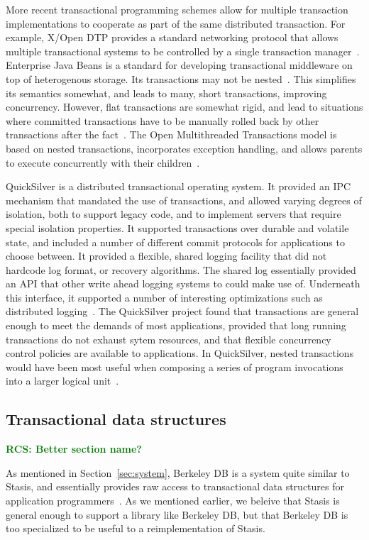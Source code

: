 \documentclass[letterpaper,twocolumn,10pt]{article}
\newcommand{\yad}{Stasis\xspace}
\newcommand{\rcs}[1]{\textcolor{green}{\bf RCS: #1}}
\begin{document}
More recent transactional programming schemes allow for multiple
transaction implementations to cooperate as part of the same
distributed transaction.  For example, X/Open DTP provides a standard
networking protocol that allows multiple transactional systems to be
controlled by a single transaction manager~\cite{something}.
Enterprise Java Beans is a standard for developing transactional
middleware on top of heterogenous storage.  Its
transactions may not be nested~\cite{something}.  This simplifies its
semantics somewhat, and leads to many, short transactions, 
improving concurrency.  However, flat transactions are somewhat rigid, and lead to
situations where committed transactions have to be manually rolled
back by other transactions after the fact~\cite{ejbCritique}.  The Open
Multithreaded Transactions model is based on nested transactions,
incorporates exception handling, and allows parents to execute
concurrently with their children~\cite{omtt}.

QuickSilver is a distributed transactional operating system.  It
provided an IPC mechanism that mandated the use of transactions, and
allowed varying degrees of isolation, both to support legacy code, and
to implement servers that require special isolation properties.  It
supported transactions over durable and volatile state, and included a
number of different commit protocols for applications to choose
between.  It provided a flexible, shared logging facility that did not
hardcode log format, or recovery algorithms.  The shared log
essentially provided an API that other write ahead logging systems to
could make use of.  Underneath this interface, it supported a number
of interesting optimizations such as distributed
logging~\cite{recoveryInQuickSilver}.  The QuickSilver project found
that transactions are general enough to meet the demands of most
applications, provided that long running transactions do not exhaust
sytem resources, and that flexible concurrency control policies are
available to applications.  In QuickSilver, nested transactions would
have been most useful when composing a series of program invocations
into a larger logical unit~\cite{experienceWithQuickSilver}.

\subsection{Transactional data structures}

\rcs{Better section name?}

As mentioned in Section~\ref{sec:system}, Berkeley DB is a system
quite similar to \yad, and essentially provides raw access to
transactional data structures for application
programmers~\cite{libtp}.  As we mentioned earlier, we beleive that
\yad is general enough to support a library like Berkeley DB, but that
Berkeley DB is too specialized to be useful to a reimplementation of
\yad.
\end{document}
